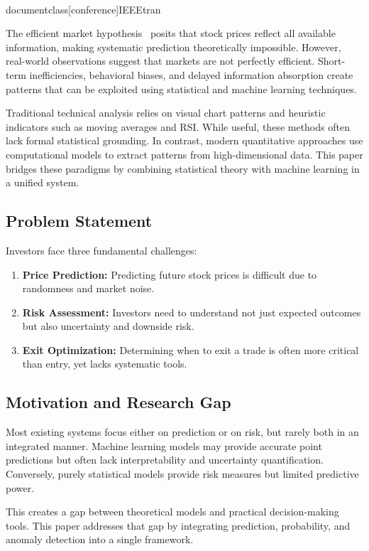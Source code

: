 \\documentclass[conference]{IEEEtran}
\begin{document}
The efficient market hypothesis~\cite{fama1970} posits that stock prices reflect all available information, making systematic prediction theoretically impossible. However, real-world observations suggest that markets are not perfectly efficient. Short-term inefficiencies, behavioral biases, and delayed information absorption create patterns that can be exploited using statistical and machine learning techniques.

Traditional technical analysis relies on visual chart patterns and heuristic indicators such as moving averages and RSI. While useful, these methods often lack formal statistical grounding. In contrast, modern quantitative approaches use computational models to extract patterns from high-dimensional data. This paper bridges these paradigms by combining statistical theory with machine learning in a unified system.

\subsection{Problem Statement}
Investors face three fundamental challenges:
\begin{enumerate}
    \item \textbf{Price Prediction:} Predicting future stock prices is difficult due to randomness and market noise.
    \item \textbf{Risk Assessment:} Investors need to understand not just expected outcomes but also uncertainty and downside risk.
    \item \textbf{Exit Optimization:} Determining when to exit a trade is often more critical than entry, yet lacks systematic tools.
\end{enumerate}

\subsection{Motivation and Research Gap}
Most existing systems focus either on prediction or on risk, but rarely both in an integrated manner. Machine learning models may provide accurate point predictions but often lack interpretability and uncertainty quantification. Conversely, purely statistical models provide risk measures but limited predictive power.

This creates a gap between theoretical models and practical decision-making tools. This paper addresses that gap by integrating prediction, probability, and anomaly detection into a single framework.
\end{document}
